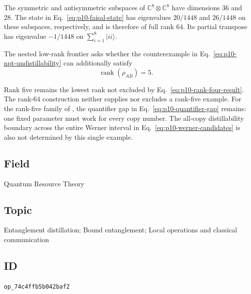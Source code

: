 The symmetric and antisymmetric subspaces of
$\mathbb C^8\otimes\mathbb C^8$ have dimensions $36$ and $28$.
The state in Eq.~\eqref{eq:p10-faisal-state} has eigenvalues
$20/1448$ and $26/1448$ on these subspaces, respectively, and is therefore
of full rank $64$. Its partial transpose has eigenvalue $-1/1448$
on $\sum_{i=1}^8\lvert ii\rangle$.

The nested low-rank frontier asks whether the counterexample in
Eq.~\eqref{eq:p10-npt-undistillability} can additionally satisfy
\begin{equation}
  \operatorname{rank}(\rho_{AB})=5.
  \label{eq:p10-rank-five-frontier}
\end{equation}

Rank five remains the lowest rank not excluded by
Eq.~\eqref{eq:p10-rank-four-result}. The rank-$64$ construction neither
supplies nor excludes a rank-five example. For the rank-five family of
, the quantifier gap in
Eq.~\eqref{eq:p10-quantifier-gap} remains: one fixed parameter must work
for every copy number. The all-copy distillability boundary across the
entire Werner interval in Eq.~\eqref{eq:p10-werner-candidates} is also
not determined by this single example.

\subsection*{Field}

Quantum Resource Theory

\subsection*{Topic}

Entanglement distillation; Bound entanglement; Local operations and classical communication

\subsection*{ID}

\texttt{op\_74c4ffb5b042baf2}
